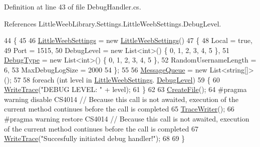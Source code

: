 Definition at line 43 of file Debug\+Handler.\+cs.



References Little\+Weeb\+Library.\+Settings.\+Little\+Weeb\+Settings.\+Debug\+Level.


\begin{DoxyCode}
44         \{
45 
46             \mbox{\hyperlink{class_little_weeb_library_1_1_settings_1_1_little_weeb_settings}{LittleWeebSettings}} = \textcolor{keyword}{new} \mbox{\hyperlink{class_little_weeb_library_1_1_handlers_1_1_debug_handler_a6707530c5bad1e3a3af39620e0f783c2}{LittleWeebSettings}}()
47             \{
48                 Local = \textcolor{keyword}{true},
49                 Port = 1515,
50                 DebugLevel = \textcolor{keyword}{new} List<int>() \{ 0, 1, 2, 3, 4, 5 \},
51                 \mbox{\hyperlink{namespace_little_weeb_library_1_1_handlers_ab66019ed40462876ec4e61bb3ccb0a62}{DebugType}} = \textcolor{keyword}{new} List<int>() \{ 0, 1, 2, 3, 4, 5 \},
52                 RandomUsernameLength = 6,
53                 MaxDebugLogSize = 2000
54             \};
55 
56             \mbox{\hyperlink{class_little_weeb_library_1_1_handlers_1_1_debug_handler_af4dc20fe66b515bdd875bb4b1124cb2a}{MessageQueue}} = \textcolor{keyword}{new} List<string[]>();
57 
58             \textcolor{keywordflow}{foreach} (\textcolor{keywordtype}{int} level \textcolor{keywordflow}{in} \mbox{\hyperlink{class_little_weeb_library_1_1_settings_1_1_little_weeb_settings}{LittleWeebSettings}}.
      \mbox{\hyperlink{class_little_weeb_library_1_1_settings_1_1_little_weeb_settings_a22ae8b2dc7e6bb5e0b3b0220484c4c86}{DebugLevel}})
59             \{
60                 \mbox{\hyperlink{class_little_weeb_library_1_1_handlers_1_1_debug_handler_ade74885424ad635ba119c8c146bd7e73}{WriteTrace}}(\textcolor{stringliteral}{"DEBUG LEVEL: "} + level);
61             \}
62 
63             \mbox{\hyperlink{class_little_weeb_library_1_1_handlers_1_1_debug_handler_a913150657a1b7f0b61e4494cc2f3eae1}{CreateFile}}();
64 \textcolor{preprocessor}{#pragma warning disable CS4014 // Because this call is not awaited, execution of the current method
       continues before the call is completed}
65             \mbox{\hyperlink{class_little_weeb_library_1_1_handlers_1_1_debug_handler_a733f22d0dabe84bf05463bdaeb2da250}{TraceWriter}}();
66 \textcolor{preprocessor}{#pragma warning restore CS4014 // Because this call is not awaited, execution of the current method
       continues before the call is completed}
67             \mbox{\hyperlink{class_little_weeb_library_1_1_handlers_1_1_debug_handler_ade74885424ad635ba119c8c146bd7e73}{WriteTrace}}(\textcolor{stringliteral}{"Succesfully initiated debug handler!"});
68 
69         \}       
\end{DoxyCode}



